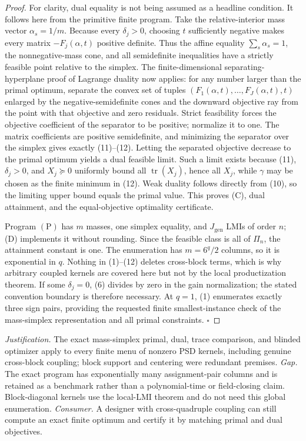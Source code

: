 \documentclass{article}
\begin{document}
\begin{proof}
For clarity, dual equality is not being assumed as a headline condition.  It follows here from the primitive finite program.  Take the relative-interior mass vector \(\alpha_s=1/m\).  Because every \(\delta_j>0\), choosing \(t\) sufficiently negative makes every matrix \(-F_j(\alpha,t)\) positive definite.  Thus the affine equality \(\sum_s\alpha_s=1\), the nonnegative-mass cone, and all semidefinite inequalities have a strictly feasible point relative to the simplex.  The finite-dimensional separating-hyperplane proof of Lagrange duality now applies: for any number larger than the primal optimum, separate the convex set of tuples \((F_1(\alpha,t),\ldots,F_J(\alpha,t),t)\) enlarged by the negative-semidefinite cones and the downward objective ray from the point with that objective and zero residuals.  Strict feasibility forces the objective coefficient of the separator to be positive; normalize it to one.  The matrix coefficients are positive semidefinite, and minimizing the separator over the simplex gives exactly (11)--(12).  Letting the separated objective decrease to the primal optimum yields a dual feasible limit.  Such a limit exists because (11), \(\delta_j>0\), and \(X_j\succeq0\) uniformly bound all \(\operatorname{tr}(X_j)\), hence all \(X_j\), while \(\gamma\) may be chosen as the finite minimum in (12).  Weak duality follows directly from (10), so the limiting upper bound equals the primal value.  This proves (C), dual attainment, and the equal-objective optimality certificate.

Program \((\mathrm P)\) has \(m\) masses, one simplex equality, and \(J_{\mathrm{gen}}\) LMIs of order \(n\); (D) implements it without rounding.  Since the feasible class is all of \(\Pi_n\), the attainment constant is one.  The enumeration has \(m=6^q/2\) columns, so it is exponential in \(q\).  Nothing in (1)--(12) deletes cross-block terms, which is why arbitrary coupled kernels are covered here but not by the local productization theorem.  If some \(\delta_j=0\), (6) divides by zero in the gain normalization; the stated convention boundary is therefore necessary.  At \(q=1\), (1) enumerates exactly three sign pairs, providing the requested finite smallest-instance check of the mass-simplex representation and all primal constraints. \(\square\)
\end{proof}
\par\smallskip\noindent \textit{Justification.} The exact mass-simplex primal, dual, trace comparison, and blinded optimizer apply to every finite menu of nonzero PSD kernels, including genuine cross-block coupling; block support and centering were redundant premises. \textit{Gap.} The exact program has exponentially many assignment-pair columns and is retained as a benchmark rather than a polynomial-time or field-closing claim. Block-diagonal kernels use the local-LMI theorem and do not need this global enumeration. \textit{Consumer.} A designer with cross-quadruple coupling can still compute an exact finite optimum and certify it by matching primal and dual objectives.
\end{document}
